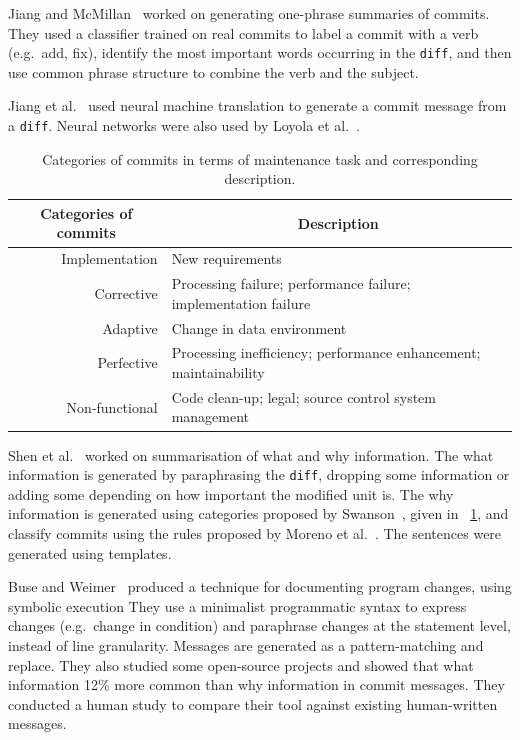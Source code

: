 \documentclass[a4paper,11pt]{sdm_internship}
\theoremstyle{definition}
\begin{document}
Jiang and McMillan~\cite{jiang2017towards} worked on generating one-phrase summaries of commits.
They used a classifier trained on real commits to label a commit with a verb (e.g.\ add, fix), identify the most important words occurring in the \texttt{diff}, and then use common phrase structure to combine the verb and the subject.

Jiang et al.~\cite{jiang2017automatically} used neural machine translation to generate a commit message from a \texttt{diff}.
Neural networks were also used by Loyola et al.~\cite{loyola2017neural}.

\begin{table}
  \centering
  \begin{tabular}{rl}
    \toprule
    \multicolumn{1}{c}{\textbf{Categories of commits}} & \multicolumn{1}{c}{\textbf{Description}} \\
    \midrule
    Implementation & New requirements \\
    Corrective & Processing failure; performance failure; implementation failure \\
    Adaptive & Change in data environment \\
    Perfective & Processing inefficiency; performance enhancement; maintainability \\
    Non-functional & Code clean-up; legal; source control system management \\
    \bottomrule
  \end{tabular}
  \caption{Categories of commits in terms of maintenance task and corresponding description.}%
  \label{tab:commit_categories}
\end{table}

Shen et al.~\cite{shen2016automatic} worked on summarisation of what and why information.
The what information is generated by paraphrasing the \texttt{diff}, dropping some information or adding some depending on how important the modified unit is.
The why information is generated using categories proposed by Swanson~\cite{swanson1976dimensions}, given in \tablename~\ref{tab:commit_categories}, and classify commits using the rules proposed by Moreno et al.~\cite{moreno2012jstereocode}.
The sentences were generated using templates.

Buse and Weimer~\cite{buse2010automatically} produced a technique for documenting program changes, using symbolic execution
They use a minimalist programmatic syntax to express changes (e.g.\ change in condition) and paraphrase changes at the statement level, instead of line granularity.
Messages are generated as a pattern-matching and replace.
They also studied some open-source projects and showed that what information 12\% more common than why information in commit messages.
They conducted a human study to compare their tool against existing human-written messages.
\end{document}
